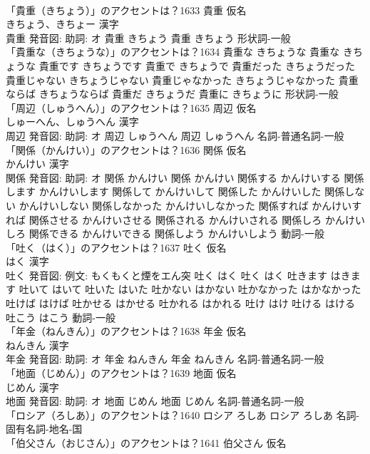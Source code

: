 \documentclass[8pt]{extreport}
\begin{document}
\begin{CJK}{UTF8}{min}
\\	「貴重（きちょう）」のアクセントは？1633	貴重 仮名　
\\	きちょう、きちょー 漢字　
\\	貴重 発音図: 助詞: オ	貴重 きちょう		貴重 きちょう				形状詞-一般 
\\	「貴重な（きちょうな）」のアクセントは？1634		貴重な きちょうな		貴重な きちょうな 貴重です きちょうです 貴重で きちょうで 貴重だった きちょうだった 貴重じゃない きちょうじゃない 貴重じゃなかった きちょうじゃなかった 貴重ならば きちょうならば 貴重だ きちょうだ 貴重に きちょうに				形状詞-一般 
\\	「周辺（しゅうへん）」のアクセントは？1635	周辺 仮名　
\\	しゅーへん、しゅうへん 漢字　
\\	周辺 発音図: 助詞: オ	周辺 しゅうへん		周辺 しゅうへん				名詞-普通名詞-一般 
\\	「関係（かんけい）」のアクセントは？1636	関係 仮名　
\\	かんけい 漢字　
\\	関係 発音図: 助詞: オ	関係 かんけい		関係 かんけい 関係する かんけいする 関係します かんけいします 関係して かんけいして 関係した かんけいした 関係しない かんけいしない 関係しなかった かんけいしなかった 関係すれば かんけいすれば 関係させる かんけいさせる 関係される かんけいされる 関係しろ かんけいしろ 関係できる かんけいできる 関係しよう かんけいしよう				動詞-一般 
\\	「吐く（はく）」のアクセントは？1637	吐く 仮名　
\\	はく 漢字　
\\	吐く 発音図: 例文: もくもくと煙をエん突	吐く はく		吐く はく 吐きます はきます 吐いて はいて 吐いた はいた 吐かない はかない 吐かなかった はかなかった 吐けば はけば 吐かせる はかせる 吐かれる はかれる 吐け はけ 吐ける はける 吐こう はこう				動詞-一般 
\\	「年金（ねんきん）」のアクセントは？1638	年金 仮名　
\\	ねんきん 漢字　
\\	年金 発音図: 助詞: オ	年金 ねんきん		年金 ねんきん				名詞-普通名詞-一般 
\\	「地面（じめん）」のアクセントは？1639	地面 仮名　
\\	じめん 漢字　
\\	地面 発音図: 助詞: オ	地面 じめん		地面 じめん				名詞-普通名詞-一般 
\\	「ロシア（ろしあ）」のアクセントは？1640		ロシア ろしあ		ロシア ろしあ				名詞-固有名詞-地名-国 
\\	「伯父さん（おじさん）」のアクセントは？1641	伯父さん 仮名　

\end{CJK}
\end{document}
